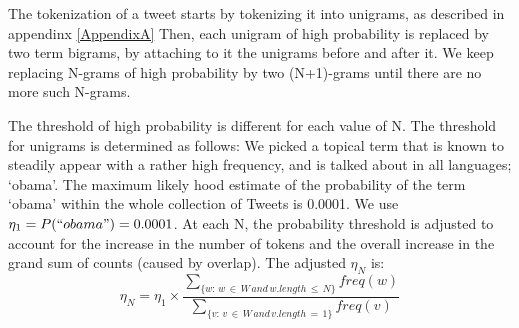 \documentclass[letterpaper,12pt,titlepage,oneside,final]{book}
\begin{document}
The tokenization of a tweet starts by tokenizing it into unigrams, 
as described in appendinx \ref{AppendixA} %
Then, each
unigram of high probability is replaced by two term bigrams, by
attaching to it the unigrams before and after it.
We keep replacing N-grams of high probability by two (N+1)-grams 
until there are no more such N-grams. %

The threshold of high probability is different for each value of N. 
The threshold for unigrams is determined as follows: 
We picked a topical term that is known to  steadily  appear with a rather high frequency, 
and is talked about in all languages; `obama'. 
The maximum likely hood estimate of the probability of the term `obama' within the whole collection of Tweets is 0.0001. 
We use $\eta_1 = P(``obama") = 0.0001$.
At each N, the probability threshold is adjusted to account for the increase
in the number of tokens and the overall increase in the grand sum of counts (caused by overlap).
The adjusted $\eta_N$ is:
\begin{equation}\eta_N = \eta_1 \times \frac{\sum_{\{w:\, w \,\in\, W\, and\, w.length \,\le\, N\}}{freq(w)}}{\sum_{\{v:\, v\, \in\, W \,and \,v.length\,=\,1\}}{freq(v)}}\end{equation}
\end{document}
